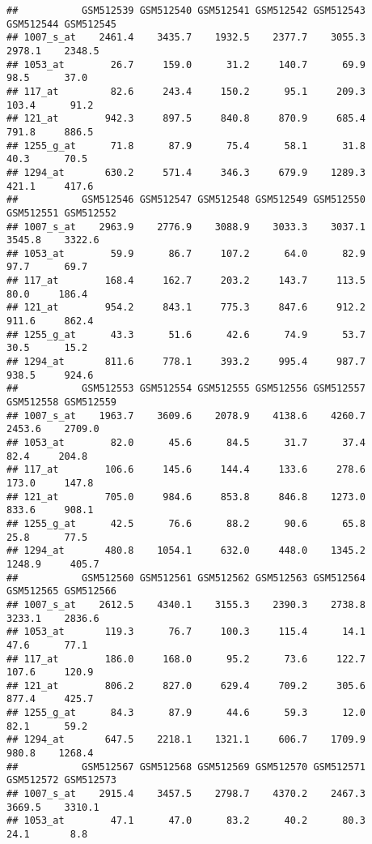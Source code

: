 \documentclass[
]{article}
\begin{document}
\begin{verbatim}
##           GSM512539 GSM512540 GSM512541 GSM512542 GSM512543 GSM512544 GSM512545
## 1007_s_at    2461.4    3435.7    1932.5    2377.7    3055.3    2978.1    2348.5
## 1053_at        26.7     159.0      31.2     140.7      69.9      98.5      37.0
## 117_at         82.6     243.4     150.2      95.1     209.3     103.4      91.2
## 121_at        942.3     897.5     840.8     870.9     685.4     791.8     886.5
## 1255_g_at      71.8      87.9      75.4      58.1      31.8      40.3      70.5
## 1294_at       630.2     571.4     346.3     679.9    1289.3     421.1     417.6
##           GSM512546 GSM512547 GSM512548 GSM512549 GSM512550 GSM512551 GSM512552
## 1007_s_at    2963.9    2776.9    3088.9    3033.3    3037.1    3545.8    3322.6
## 1053_at        59.9      86.7     107.2      64.0      82.9      97.7      69.7
## 117_at        168.4     162.7     203.2     143.7     113.5      80.0     186.4
## 121_at        954.2     843.1     775.3     847.6     912.2     911.6     862.4
## 1255_g_at      43.3      51.6      42.6      74.9      53.7      30.5      15.2
## 1294_at       811.6     778.1     393.2     995.4     987.7     938.5     924.6
##           GSM512553 GSM512554 GSM512555 GSM512556 GSM512557 GSM512558 GSM512559
## 1007_s_at    1963.7    3609.6    2078.9    4138.6    4260.7    2453.6    2709.0
## 1053_at        82.0      45.6      84.5      31.7      37.4      82.4     204.8
## 117_at        106.6     145.6     144.4     133.6     278.6     173.0     147.8
## 121_at        705.0     984.6     853.8     846.8    1273.0     833.6     908.1
## 1255_g_at      42.5      76.6      88.2      90.6      65.8      25.8      77.5
## 1294_at       480.8    1054.1     632.0     448.0    1345.2    1248.9     405.7
##           GSM512560 GSM512561 GSM512562 GSM512563 GSM512564 GSM512565 GSM512566
## 1007_s_at    2612.5    4340.1    3155.3    2390.3    2738.8    3233.1    2836.6
## 1053_at       119.3      76.7     100.3     115.4      14.1      47.6      77.1
## 117_at        186.0     168.0      95.2      73.6     122.7     107.6     120.9
## 121_at        806.2     827.0     629.4     709.2     305.6     877.4     425.7
## 1255_g_at      84.3      87.9      44.6      59.3      12.0      82.1      59.2
## 1294_at       647.5    2218.1    1321.1     606.7    1709.9     980.8    1268.4
##           GSM512567 GSM512568 GSM512569 GSM512570 GSM512571 GSM512572 GSM512573
## 1007_s_at    2915.4    3457.5    2798.7    4370.2    2467.3    3669.5    3310.1
## 1053_at        47.1      47.0      83.2      40.2      80.3      24.1       8.8

\end{verbatim}
\end{document}
